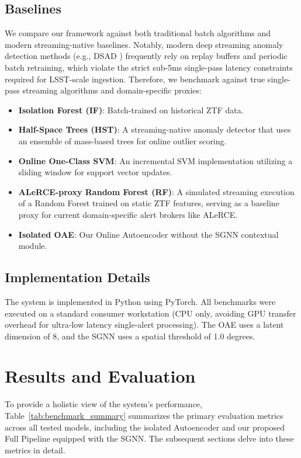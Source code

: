 \documentclass[10pt,journal,compsoc]{IEEEtran}
\begin{document}
\subsection{Baselines}
We compare our framework against both traditional batch algorithms and modern streaming-native baselines. Notably, modern deep streaming anomaly detection methods (e.g., DSAD \cite{zhao2020anomaly}) frequently rely on replay buffers and periodic batch retraining, which violate the strict sub-5ms single-pass latency constraints required for LSST-scale ingestion. Therefore, we benchmark against true single-pass streaming algorithms and domain-specific proxies:
\begin{itemize}
    \item \textbf{Isolation Forest (IF)}: Batch-trained on historical ZTF data.
    \item \textbf{Half-Space Trees (HST)}: A streaming-native anomaly detector that uses an ensemble of mass-based trees for online outlier scoring.
    \item \textbf{Online One-Class SVM}: An incremental SVM implementation utilizing a sliding window for support vector updates.
    \item \textbf{ALeRCE-proxy Random Forest (RF)}: A simulated streaming execution of a Random Forest trained on static ZTF features, serving as a baseline proxy for current domain-specific alert brokers like ALeRCE.
    \item \textbf{Isolated OAE}: Our Online Autoencoder without the SGNN contextual module.
\end{itemize}

\subsection{Implementation Details}
The system is implemented in Python using PyTorch. All benchmarks were executed on a standard consumer workstation (CPU only, avoiding GPU transfer overhead for ultra-low latency single-alert processing). The OAE uses a latent dimension of 8, and the SGNN uses a spatial threshold of 1.0 degrees.

\section{Results and Evaluation}

To provide a holistic view of the system's performance, Table~\ref{tab:benchmark_summary} summarizes the primary evaluation metrics across all tested models, including the isolated Autoencoder and our proposed Full Pipeline equipped with the SGNN. The subsequent sections delve into these metrics in detail.
\end{document}
